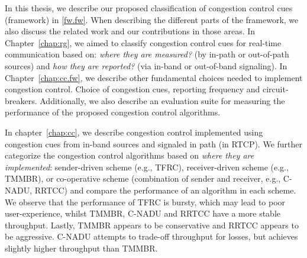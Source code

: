
In this thesis, we describe our proposed classification of congestion control
cues (framework) in \ref{fw.fw}. When describing the different parts of the
framework, we also discuss the related work and our contributions in those
areas. In Chapter~\ref{chap:rg}, we aimed to classify congestion control cues
for real-time communication based on: \emph{where they are measured?} (by
in-path or out-of-path sources) and \emph{how they are reported?} (via in-band
or out-of-band signaling). In Chapter~\ref{chap:cc.fw}, we describe other
fundamental choices needed to implement congestion control. Choice of
congestion cues, reporting frequency and circuit-breakers. Additionally, we
also describe an evaluation suite for measuring the performance of the
proposed congestion control algorithms.

In chapter~\ref{chap:cc}, we describe congestion control implemented using
congestion cues from in-band sources and signaled in path (in RTCP). We
further categorize the congestion control algorithms based on \emph{where they
are implemented}: sender-driven scheme (e.g., TFRC), receiver-driven scheme
(e.g., TMMBR), or co-operative scheme (combination of sender and receiver,
e.g., C-NADU, RRTCC) and compare the performance of an algorithm in each
scheme. We observe that the performance of TFRC is bursty, which may lead to
poor user-experience, whilst TMMBR, C-NADU and RRTCC have a more stable
throughput. Lastly, TMMBR appears to be conservative and RRTCC appears to be
aggressive. C-NADU attempts to trade-off throughput for losses, but achieves
slightly higher throughput than TMMBR.


